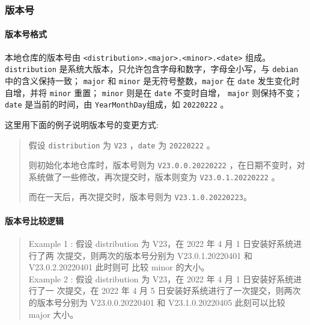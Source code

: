 \documentclass{utart}
\begin{document}
\subsubsection{版本号}
\paragraph{版本号格式}
本地仓库的版本号由 \texttt{<distribution>.<major>.<minor>.<date>} 组成。
\texttt{distribution} 是系统大版本，只允许包含字母和数字，字母全小写，与 \texttt{debian} 中的含义保持一致；
\texttt{major} 和 \texttt{minor} 是无符号整数，\texttt{major} 在 \texttt{date} 发生变化时自增，并将 \texttt{minor} 重置；
\texttt{minor} 则是在 \texttt{date} 不变时自增， \texttt{major} 则保持不变；
\texttt{date} 是当前的时间，由 \texttt{YearMonthDay}组成，如 \texttt{20220222} 。

这里用下面的例子说明版本号的变更方式: 

\begin{quote}
假设 \texttt{distribution} 为 \texttt{V23} ，\texttt{date} 为 \texttt{20220222} 。

则初始化本地仓库时，版本号则为 \texttt{V23.0.0.20220222} ，在日期不变时，对系统做了一些修改，再次提交时，版本则变为 \texttt{V23.0.1.20220222} 。

而在一天后，再次提交时，版本号则为 \texttt{V23.1.0.20220223}。
\end{quote}
\paragraph{版本号比较逻辑}
\begin{quote}
Example 1 : 假设 distribution 为 V23，在 2022 年 4 月 1 日安装好系统进行了两
次提交，则两次的版本号分别为 V23.0.1.20220401 和 V23.0.2.20220401 此时则可
比较 minor 的大小。\\

Example 2 : 假设 distribution 为 V23，在 2022 年 4 月 1 日安装好系统进行了一
次提交，在 2022 年 4 月 5 日安装好系统进行了一次提交，则两次的版本号分别为
V23.0.0.20220401 和 V23.1.0.20220405 此刻可以比较 major 大小。
\end{quote}
\end{document}
